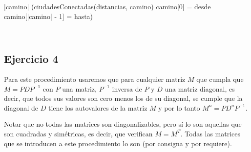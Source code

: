 \documentclass[10pt,a4paper]{article}
\begin{document}
{}

{}

{}

{}

{|camino|  \yLuego (ciudadesConectadas(distancias, camino) \land 
camino[0] = desde \land
camino[|camino| - 1] = hasta)} 

{ \yLuego \\ 
}

\subsection{Ejercicio 4}

Para este procedimiento usaremos que para cualquier matriz $M$ que cumpla que $M = PDP^{-1}$ con $P$ una matriz,
$P^{-1}$ inversa de $P$ y $D$ una matriz diagonal, es decir, que todos sus valores son cero menos los de su diagonal, se cumple que la diagonal
de $D$ tiene los autovalores de la matriz $M$ y por lo tanto $M^{n} = PD^{n}P^{-1}$.

Notar que no todas las matrices son diagonalizables, pero sí lo son aquellas que son cuadradas y simétricas,
es decir, que verifican $M = M^{T}$. Todas las matrices que se introducen a este procedimiento lo son (por consigna y por requiere).
\end{document}
